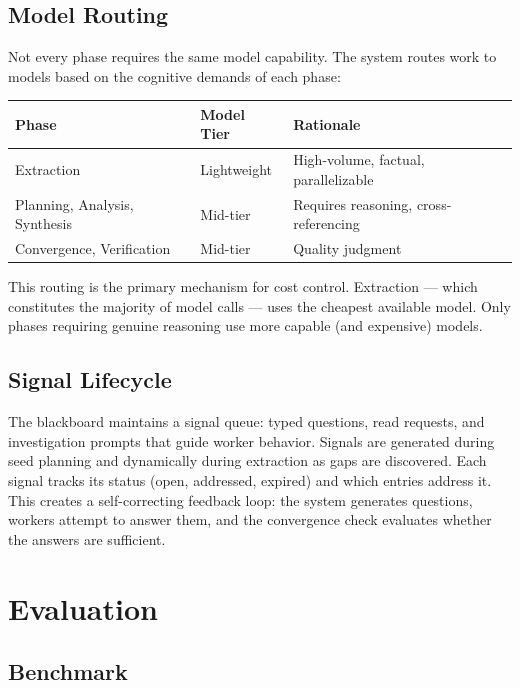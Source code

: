 \documentclass[11pt,a4paper]{article}
\begin{document}
\subsection{Model Routing}

Not every phase requires the same model capability. The system routes work to models based on the cognitive demands of each phase:

\begin{center}
\begin{tabular}{lll}
\toprule
\textbf{Phase} & \textbf{Model Tier} & \textbf{Rationale} \\
\midrule
Extraction & Lightweight & High-volume, factual, parallelizable \\
Planning, Analysis, Synthesis & Mid-tier & Requires reasoning, cross-referencing \\
Convergence, Verification & Mid-tier & Quality judgment \\
\bottomrule
\end{tabular}
\end{center}

This routing is the primary mechanism for cost control. Extraction — which constitutes the majority of model calls — uses the cheapest available model. Only phases requiring genuine reasoning use more capable (and expensive) models.

\subsection{Signal Lifecycle}

The blackboard maintains a signal queue: typed questions, read requests, and investigation prompts that guide worker behavior. Signals are generated during seed planning and dynamically during extraction as gaps are discovered. Each signal tracks its status (open, addressed, expired) and which entries address it. This creates a self-correcting feedback loop: the system generates questions, workers attempt to answer them, and the convergence check evaluates whether the answers are sufficient.


\section{Evaluation}

\subsection{Benchmark}
\end{document}
